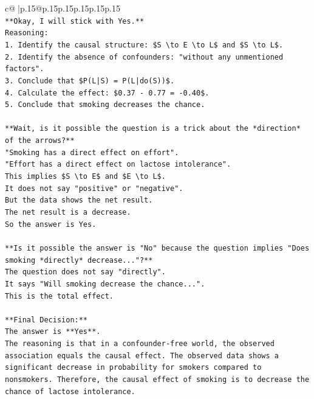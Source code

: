 \documentclass{article}
\begin{document}
{\begin{supertabular}{c@{$\;$}|p{.15\linewidth}@{}p{.15\linewidth}p{.15\linewidth}p{.15\linewidth}p{.15\linewidth}p{.15\linewidth}}
{{{\\ 
\texttt{**Okay, I will stick with Yes.**} \\
\texttt{Reasoning:} \\
\texttt{1.  Identify the causal structure: \$S \textbackslash{}to E \textbackslash{}to L\$ and \$S \textbackslash{}to L\$.} \\
\texttt{2.  Identify the absence of confounders: "without any unmentioned factors".} \\
\texttt{3.  Conclude that \$P(L|S) = P(L|do(S))\$.} \\
\texttt{4.  Calculate the effect: \$0.37 {-} 0.77 = {-}0.40\$.} \\
\texttt{5.  Conclude that smoking decreases the chance.} \\
\\ 
\texttt{**Wait, is it possible the question is a trick about the *direction* of the arrows?**} \\
\texttt{"Smoking has a direct effect on effort".} \\
\texttt{"Effort has a direct effect on lactose intolerance".} \\
\texttt{This implies \$S \textbackslash{}to E\$ and \$E \textbackslash{}to L\$.} \\
\texttt{It does not say "positive" or "negative".} \\
\texttt{But the data shows the net result.} \\
\texttt{The net result is a decrease.} \\
\texttt{So the answer is Yes.} \\
\\ 
\texttt{**Is it possible the answer is "No" because the question implies "Does smoking *directly* decrease..."?**} \\
\texttt{The question does not say "directly".} \\
\texttt{It says "Will smoking decrease the chance...".} \\
\texttt{This is the total effect.} \\
\\ 
\texttt{**Final Decision:**} \\
\texttt{The answer is **Yes**.} \\
\texttt{The reasoning is that in a confounder{-}free world, the observed association equals the causal effect. The observed data shows a significant decrease in probability for smokers compared to nonsmokers. Therefore, the causal effect of smoking is to decrease the chance of lactose intolerance.} \\
}}}
\end{supertabular}}
\end{document}
